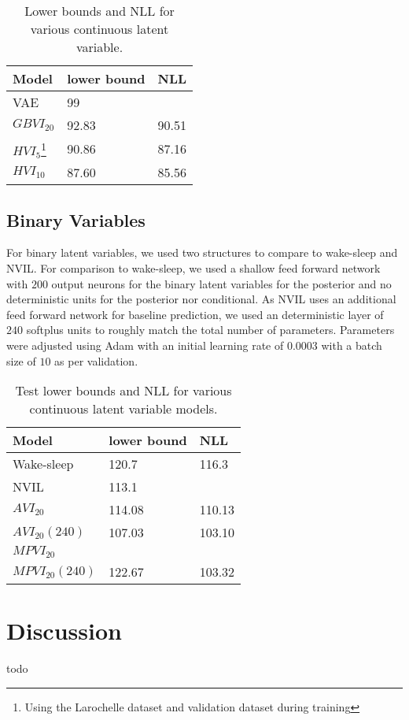 \documentclass[preprint, twocolumn]{article}
\begin{document}
\begin{table}
\label{table:continuous}
\begin{tabular}{ | m{5em} | m{1cm}| m{1cm} | } 
\hline
Model & lower bound & NLL \\ 
\hline
\hline
VAE & 99 &  \\ 
\hline
$GBVI_{20}$ & 92.83 & 90.51 \\ 
\hline
\hline
$HVI_5$\footnote[1]{Using the Larochelle dataset and validation dataset during training} &  90.86 & 87.16 \\ 
$HVI_{10}$\footnote[1] & 87.60 & 85.56 \\ 
\hline
\end{tabular}
\caption{Lower bounds and NLL for various continuous latent variable.}
\end{table}

\subsection{Binary Variables}
For binary latent variables, we used two structures to compare to wake-sleep and NVIL. For comparison to wake-sleep, we used a shallow feed forward network with $200$ output neurons for the binary latent variables for the posterior and no deterministic units for the posterior nor conditional. As NVIL uses an additional feed forward network for baseline prediction, we used an deterministic layer of $240$ softplus units to roughly match the total number of parameters. Parameters were adjusted using Adam \cite{kingma2014method} with an initial learning rate of \num{0.0003} with a batch size of $10$ as per validation.

\begin{table}
\label{table:binary}
\begin{tabular}{ | m{5em} | m{1cm}| m{1cm} | } 
\hline
Model & lower bound & NLL \\ 
\hline
\hline
Wake-sleep & 120.7 & 116.3 \\ 
\hline
NVIL & 113.1 &  \\ 
\hline
$AVI_{20}$ & 114.08 & 110.13 \\
$AVI_{20}(240)$ & 107.03 & 103.10 \\
\hline
$MPVI_{20}$ &  &  \\
$MPVI_{20}(240)$ & 122.67  & 103.32 \\
\hline
\end{tabular}
\caption{Test lower bounds and NLL for various continuous latent variable models.}
\end{table}

\section{Discussion}
todo



\end{document}
